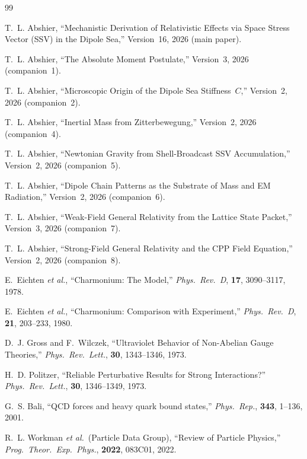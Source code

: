 \documentclass[12pt]{article}
\begin{document}
\begin{thebibliography}{99}

T.~L. Abshier,
``Mechanistic Derivation of Relativistic Effects via Space Stress
Vector (SSV) in the Dipole Sea,''
Version~16, 2026 (main paper).

T.~L. Abshier,
``The Absolute Moment Postulate,''
Version~3, 2026 (companion~1).

T.~L. Abshier,
``Microscopic Origin of the Dipole Sea Stiffness~$C$,''
Version~2, 2026 (companion~2).

T.~L. Abshier,
``Inertial Mass from Zitterbewegung,''
Version~2, 2026 (companion~4).

T.~L. Abshier,
``Newtonian Gravity from Shell-Broadcast SSV Accumulation,''
Version~2, 2026 (companion~5).

T.~L. Abshier,
``Dipole Chain Patterns as the Substrate of Mass and EM Radiation,''
Version~2, 2026 (companion~6).

T.~L. Abshier,
``Weak-Field General Relativity from the Lattice State Packet,''
Version~3, 2026 (companion~7).

T.~L. Abshier,
``Strong-Field General Relativity and the CPP Field Equation,''
Version~2, 2026 (companion~8).

E.~Eichten \textit{et al.},
``Charmonium: The Model,''
\textit{Phys.\ Rev.\ D}, \textbf{17}, 3090--3117, 1978.

E.~Eichten \textit{et al.},
``Charmonium: Comparison with Experiment,''
\textit{Phys.\ Rev.\ D}, \textbf{21}, 203--233, 1980.

D.~J. Gross and F.~Wilczek,
``Ultraviolet Behavior of Non-Abelian Gauge Theories,''
\textit{Phys.\ Rev.\ Lett.}, \textbf{30}, 1343--1346, 1973.

H.~D. Politzer,
``Reliable Perturbative Results for Strong Interactions?''
\textit{Phys.\ Rev.\ Lett.}, \textbf{30}, 1346--1349, 1973.

G.~S. Bali,
``QCD forces and heavy quark bound states,''
\textit{Phys.\ Rep.}, \textbf{343}, 1--136, 2001.

R.~L. Workman \textit{et al.}\ (Particle Data Group),
``Review of Particle Physics,''
\textit{Prog.\ Theor.\ Exp.\ Phys.}, \textbf{2022}, 083C01, 2022.

\end{thebibliography}
\end{document}
